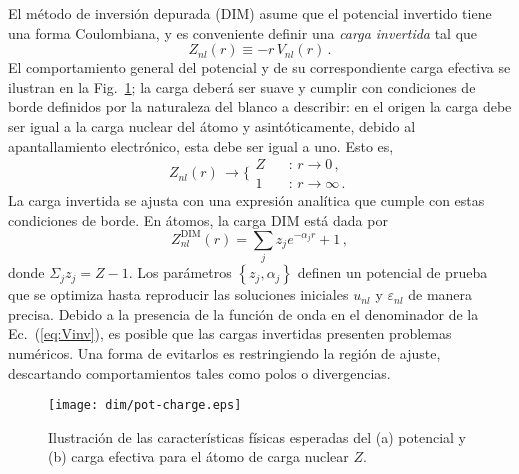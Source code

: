 El método de inversión depurada (DIM) asume que el potencial invertido 
tiene una forma Coulombiana, y es conveniente definir una \textit{carga 
invertida} tal que
\begin{equation}
Z_{nl}(r) \equiv -r \, V_{nl}(r) \,.
\label{eq:Zinv}
\end{equation}
El comportamiento general del potencial y de su correspondiente carga 
efectiva se ilustran en la Fig.~\ref{fig:potycharge}; la carga deberá 
ser suave y cumplir con condiciones de borde definidos por la naturaleza 
del blanco a describir: 
en el origen la carga debe ser igual a la carga nuclear del átomo y 
asintóticamente, debido al apantallamiento electrónico, esta debe ser
igual a uno. Esto es,
\begin{equation}
Z_{nl}(r) \, \rightarrow 
\bigg\{ 
\begin{array}{ll}
Z  \ \  & \ \ \text{:\ \ }r  \rightarrow 0 \,, \\ 
1           & \ \ \text{:\ \ }r  \rightarrow \infty \,.
\end{array}
\label{eq:Zasympt}
\end{equation} 
La carga invertida se ajusta con una expresión analítica que cumple con 
estas condiciones de borde. En átomos, la carga DIM está dada por
\begin{equation}
Z_{nl}^{\mathrm{DIM}}(r)= \sum_j z_j e^{-\alpha_j r}+1 \,,
\label{eq:atomzDIM}
\end{equation}
donde $\Sigma_j z_j=Z-1$. Los parámetros $\left\{z_j,\alpha_j\right\}$ 
definen un potencial de prueba que se optimiza hasta reproducir las 
soluciones iniciales $u_{nl}$ y $\varepsilon_{nl}$ de manera precisa. 
Debido a la presencia de la función de onda en el denominador de la 
Ec.~(\ref{eq:Vinv}), es posible que las cargas invertidas presenten 
problemas numéricos. Una forma de evitarlos es restringiendo la región 
de ajuste, descartando comportamientos tales como polos o divergencias. 

\begin{figure}[t]
\centering
\texttt{[image: dim/pot-charge.eps]}
\caption[Características físicas del potencial y carga efectiva.]
{Ilustración de las características físicas esperadas del (a) potencial 
y (b) carga efectiva para el átomo de carga nuclear $Z$.}
\label{fig:potycharge}
\end{figure}

